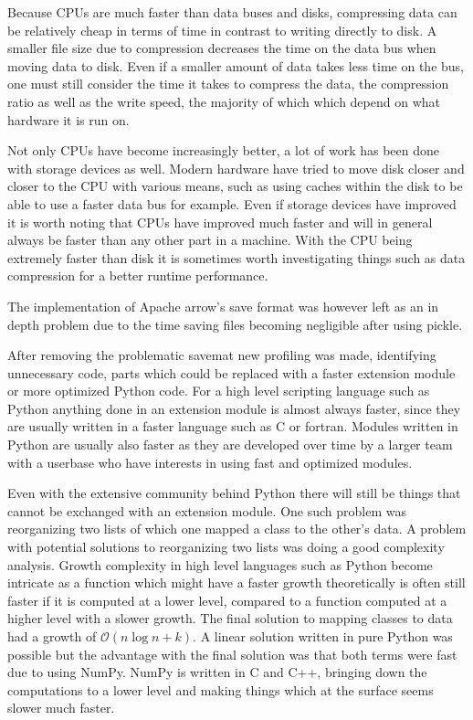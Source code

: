\documentclass[12pt, a4paper]{article}
\begin{document}
Because CPUs are much faster than data buses and disks, compressing data can be relatively cheap in terms of time in contrast to writing directly to disk.
A smaller file size due to compression decreases the time on the data bus when moving data to disk.
Even if a smaller amount of data takes less time on the bus, one must still consider the time it takes to compress the data, the compression ratio as well as the write speed, the majority of which which depend on what hardware it is run on.

Not only CPUs have become increasingly better, a lot of work has been done with storage devices as well.
Modern hardware have tried to move disk closer and closer to the CPU with various means, such as using caches within the disk to be able to use a faster data bus for example.
Even if storage devices have improved it is worth noting that CPUs have improved much faster and will in general always be faster than any other part in a machine.
With the CPU being extremely faster than disk it is sometimes worth investigating things such as data compression for a better runtime performance.

The implementation of Apache arrow's save format was however left as an in depth problem due to the time saving files becoming negligible after using pickle.

After removing the problematic savemat new profiling was made, identifying unnecessary code, parts which could be replaced with a faster extension module or more optimized Python code.
For a high level scripting language such as Python anything done in an extension module is almost always faster, since they are usually written in a faster language such as C or fortran.
Modules written in Python are usually also faster as they are developed over time by a larger team with a userbase who have interests in using fast and optimized modules.

Even with the extensive community behind Python there will still be things that cannot be exchanged with an extension module.
One such problem was reorganizing two lists of which one mapped a class to the other's data.
A problem with potential solutions to reorganizing two lists was doing a good complexity analysis.
Growth complexity in high level languages such as Python become intricate as a function which might have a faster growth theoretically is often still faster if it is computed at a lower level, compared to a function computed at a higher level with a slower growth.
The final solution to mapping classes to data had a growth of $\mathcal{O}(n\log n + k)$.
A linear solution written in pure Python was possible but the advantage with the final solution was that both terms were fast due to using NumPy.
NumPy is written in C and C++, bringing down the computations to a lower level and making things which at the surface seems slower much faster.

\end{document}
